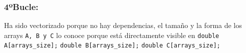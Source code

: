 \subsubsection{\textbf{4ºBucle:}}
\par Ha sido vectorizado porque no hay dependencias, el tamaño y la forma de los arrays \texttt{A, B y C} lo conoce porque está
directamente visible en \texttt{double A[arrays\_size];} 
\texttt{double B[arrays\_size];} \texttt{double C[arrays\_size];}
